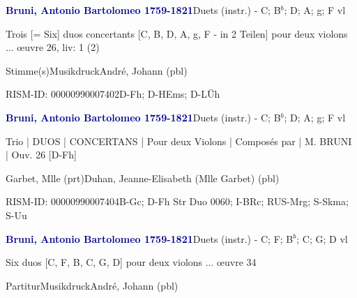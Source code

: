 \documentclass[twocolumn]{book}
\begin{document}
\par \vspace{7pt} \textcolor{darkblue}{\textbf{Bruni, Antonio Bartolomeo  1759-1821}}\hfillplus{\textbf{[249]}}\newline Duets (instr.) - C; B$^b$; D; A; g; F vl
\par \begin{itshape}Trois [= Six] duos concertants [C, B, D, A, g, F - in 2 Teilen] pour deux violons ... œuvre 26, liv: 1 (2)\end{itshape} 
\par \textcolor{darkblue}{}  Stimme(s)\newline Musikdruck\newline André, Johann  (pbl)
\par RISM-ID: 00000990007402\newline D-Fh; D-HEms; D-LÜh
\par \vspace{7pt} \textcolor{darkblue}{\textbf{Bruni, Antonio Bartolomeo  1759-1821}}\hfillplus{\textbf{[250]}}\newline Duets (instr.) - C; B$^b$; D; A; g; F vl
\par \begin{itshape}Trio | DUOS | CONCERTANS | Pour deux Violons | Composés par | M. BRUNI | Ouv. 26 [D-Fh]\end{itshape} \newline Garbet, Mlle  (prt)\newline Duhan, Jeanne-Elisabeth (Mlle Garbet)  (pbl)
\par RISM-ID: 00000990007404\newline B-Gc; D-Fh  Str Duo 0060; I-BRc; RUS-Mrg; S-Skma; S-Uu
\par \vspace{7pt} \textcolor{darkblue}{\textbf{Bruni, Antonio Bartolomeo  1759-1821}}\hfillplus{\textbf{[251]}}\newline Duets (instr.) - C; F; B$^b$; C; G; D vl
\par \begin{itshape}Six duos [C, F, B, C, G, D] pour deux violons ... œuvre 34\end{itshape} 
\par \textcolor{darkblue}{}  Partitur\newline Musikdruck\newline André, Johann  (pbl)
\end{document}
